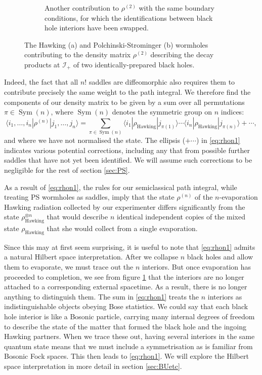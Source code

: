 \documentclass[letterpaper,12pt]{article}
\DeclareMathOperator{\Sym}{Sym}
\newcommand*{\scri}{\mathscr{I}} %
\begin{document}
\begin{figure}
\begin{subfigure}[t]{.48\textwidth}
		\caption{Another contribution to $\rho^{(2)}$ with the same boundary conditions, for which the identifications between black hole interiors have been swapped.}
\label{fig:PSrho2b}
\end{subfigure}
\caption{The Hawking (a) and Polchinski-Strominger (b) wormholes contributing to the density matrix $\rho^{(2)}$ describing the decay products at $\scri_+$ of two identically-prepared black holes.\label{fig:PSrho2}}
\end{figure}
%

Indeed,
the fact that all $n!$ saddles are diffeomorphic also requires them to contribute precisely the same weight to the path integral.
We therefore find the components of our density matrix to be given by a sum over all permutations $\pi\in \Sym(n)$, where $\Sym(n)$ denotes the symmetric group on $n$ indices:
\begin{equation}\label{eq:rhon1}
	\langle i_1,\ldots,i_n|\rho^{(n)}|j_1,\ldots,j_n\rangle = \sum_{\pi\in \Sym(n)} \langle i_1|\rho_\text{Hawking}|j_{\pi(1)}\rangle \cdots \langle i_n|\rho_\text{Hawking}|j_{\pi(n)}\rangle + \cdots,
\end{equation}
and where we have not normalised the state.  The ellipsis ($+\cdots$) in \eqref{eq:rhon1} indicates various potential corrections, including any that from possible further saddles that have not yet been identified. We will assume such corrections to be negligible for the rest of section \ref{sec:PS}.


As a result of \eqref{eq:rhon1}, the rules for our semiclassical path integral, while treating PS wormholes as saddles, imply that the state $\rho^{(n)}$ of the $n$-evaporation Hawking radiation collected by our experimenter  differs significantly from the state $\rho_\text{Hawking}^{\otimes n}$ that would describe $n$ identical independent copies of the mixed state $\rho_\text{Hawking}$ that she would collect from a single evaporation.


Since this may at first seem surprising, it is useful to note that \eqref{eq:rhon1} admits a natural Hilbert space interpretation. After we collapse $n$ black holes and allow them to evaporate, we must trace out the $n$ interiors. But once evaporation has proceeded to completion, we see from figure \ref{fig:PSrho2b} that the interiors are no longer attached to a corresponding external spacetime.  As a result, there is no longer anything to distinguish them. The sum in \eqref{eq:rhon1} treats the $n$ interiors as indistinguishable objects obeying Bose statistics. We could say that each black hole interior is like a Bosonic particle, carrying many internal degrees of freedom to describe the state of the matter that formed the black hole and the ingoing Hawking partners. When we trace these out, having several interiors in the same quantum state means that we must include a symmetrisation as is familiar from Bosonic Fock spaces.  This then leads to  \eqref{eq:rhon1}. We will explore the Hilbert space interpretation in more detail in section \ref{sec:BUetc}.
\end{document}
